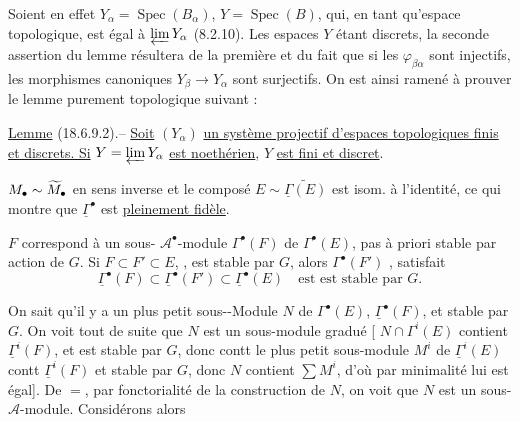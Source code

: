 Soient en effet $Y_\alpha=\operatorname{Spec}(B_\alpha)$, $Y=\operatorname{Spec}(B)$, qui, en tant qu'espace topologique, est égal à $\varprojlim Y_\alpha$ (8.2.10). Les espaces $Y$ étant   discrets, la seconde assertion du lemme résultera de la première et du fait que si les $\varphi_{\beta\alpha}$ sont injectifs, les morphismes canoniques $Y_\beta\to Y_\alpha$ sont surjectifs. On est ainsi ramené à prouver le lemme purement topologique suivant :

\uline{Lemme} (18.6.9.2).-- \uline{Soit} $(Y_\alpha)$ \uline{un système projectif d'espaces topologiques finis et discrets. Si} $Y=\varprojlim Y_\alpha$ \uline{est noethérien}, $Y$ \uline{est fini et discret}.


$M_\bullet\sim\widetilde M_\bullet$ en sens inverse  et le composé  $E\sim\widetilde{\underline{\Gamma}(E)}$ est isom. à l'identité, ce qui montre que $\underline{\Gamma}^\bullet$ est \uline{pleinement fidèle}.

$F$ correspond à un sous- $\mathcal A^\bullet$-module $\Gamma^\bullet(F)$ de $\Gamma^\bullet(E)$, pas à priori stable par action de $G$. Si   $F\subset F'\subset E$, , est stable par $G$, alors $\Gamma^\bullet(F')$ , satisfait
\[
\underline{\Gamma}^\bullet(F)\subset\underline{\Gamma}^\bullet(F')\subset\underline{\Gamma}^\bullet(E)\quad\text{est est stable par }G.
\]

On sait qu'il y a un plus petit sous--Module $N$ de $\Gamma^\bullet(E)$,  $\underline{\Gamma}^\bullet(F)$, et stable par $G$. On voit tout de suite que $N$ est un sous-module gradué [ $N\cap\Gamma^i(E)$ contient $\underline{\Gamma}^i(F)$, et est stable par $G$, donc contt le plus petit sous-module $M^i$ de $\underline{\Gamma}^i(E)$ contt $\underline{\Gamma}^i(F)$ et stable par $G$, donc $N$ contient $\sum M^i$, d'où par minimalité lui est égal]. De $=$, par fonctorialité de la construction de $N$, on voit que $N$ est un sous-$\mathcal A$-module. Considérons alors


